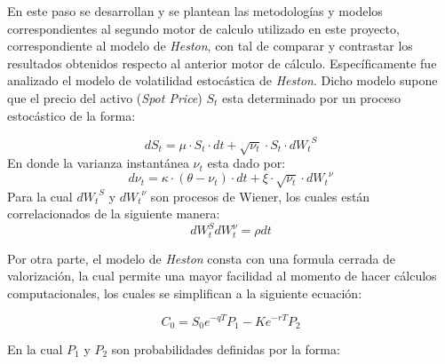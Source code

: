 \noindent En este paso se desarrollan y se plantean las metodologías y modelos correspondientes al segundo motor de calculo utilizado en este proyecto, correspondiente al modelo de \textit{Heston}, con tal de comparar y contrastar los resultados obtenidos respecto al anterior motor de cálculo. Específicamente fue analizado el modelo de volatilidad estocástica de \textit{Heston}. Dicho modelo supone que el precio del activo (\textit{Spot Price}) $S_t$ esta determinado por un proceso estocástico de la forma: 

\begin{equation}
    dS_t=\mu \cdot S_t \cdot dt+\sqrt{\nu_t}\cdot S_t \cdot {dW_t}^S
\end{equation}
\noindent En donde la varianza instantánea $\nu_t$ esta dado por:
\begin{equation}
    d\nu_t=\kappa\cdot (\theta-\nu_t) \cdot dt+\xi \cdot \sqrt{\nu_t}\cdot {dW_t}^\nu
\end{equation}
\noindent Para la cual ${dW_t}^S$ y ${dW_t}^\nu$ son procesos de Wiener, los cuales están correlacionados de la siguiente manera:
\begin{equation}
    d W_{t}^{S} d W_{ t}^{\nu}=\rho d t
\end{equation}

\noindent Por otra parte, el modelo de \textit{Heston} consta con una formula cerrada de valorización, la cual permite una mayor facilidad al momento de hacer cálculos computacionales, los cuales se simplifican a la siguiente ecuación:

\begin{equation}
    C_{0}=S_{0} e^{-q T} P_{1}-K e^{-r T} P_{2}
\end{equation}

\noindent En la cual $P_1$ y $P_2$ son probabilidades definidas por la forma:

